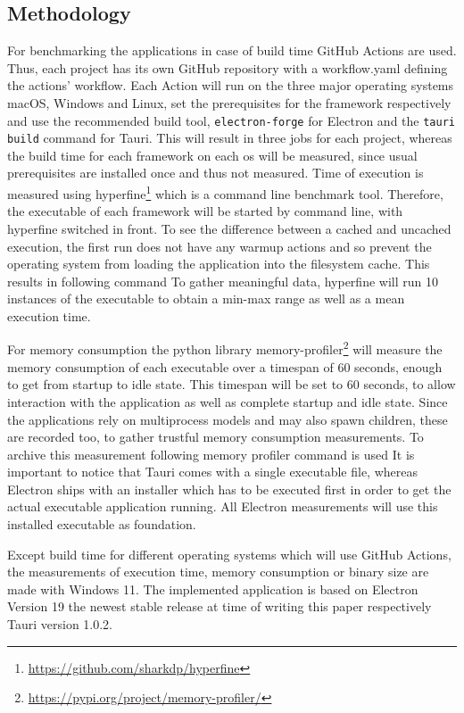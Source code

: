 \subsection{Methodology}
\label{subsec:method}
For benchmarking the applications in case of build time GitHub Actions are used.
Thus, each project has its own GitHub repository with a workflow.yaml defining the actions' workflow.
Each Action will run on the three major operating systems macOS, Windows and Linux, set the prerequisites for the framework respectively and use the recommended build tool, \texttt{electron-forge} for Electron and the \texttt{tauri build} command for Tauri.
This will result in three jobs for each project, whereas the build time for each framework on each os will be measured, since usual prerequisites are installed once and thus not measured.
Time of execution is measured using hyperfine\footnote{\url{https://github.com/sharkdp/hyperfine}} which is a command line benchmark tool.
Therefore, the executable of each framework will be started by command line, with hyperfine switched in front.
To see the difference between a cached and uncached execution, the first run does not have any warmup actions and so prevent the operating system from loading the application into the filesystem cache.
This results in following command 
To gather meaningful data, hyperfine will run 10 instances of the executable to obtain a min-max range as well as a mean execution time.

For memory consumption the python library memory-profiler\footnote{\url{https://pypi.org/project/memory-profiler/}} will measure the memory consumption of each executable over a timespan of 60 seconds,
enough to get from startup to idle state.
This timespan will be set to 60 seconds, to allow interaction with the application as well as complete startup and idle state.
Since the applications rely on multiprocess models and may also spawn children, these are recorded too, to gather trustful memory consumption measurements.
To archive this measurement following memory profiler command is used 
It is important to notice that Tauri comes with a single executable file, whereas Electron ships with an installer which has to be executed first in order to get the actual executable application running.
All Electron measurements will use this installed executable as foundation.

Except build time for different operating systems which will use GitHub Actions, the measurements of execution time, memory consumption or binary size
are made with Windows 11.
The implemented application is based on Electron Version 19 the newest stable release at time of writing this paper respectively Tauri version 1.0.2.

